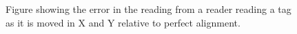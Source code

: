 \begin{figure}[h]
	
	\caption{Figure showing the error in the reading from a reader reading a tag as it is moved in X and Y relative to perfect alignment.}
	\label{fig:histogram}
\end{figure}

